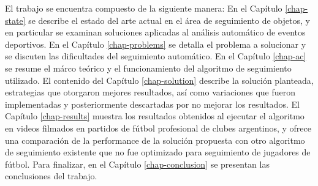 \documentclass[a4paper,11pt]{report}
\begin{document}
El trabajo se encuentra compuesto de la siguiente manera: En el Capítulo
\ref{chap-state} se describe el estado del arte actual en el área de
seguimiento de objetos, y en particular se examinan soluciones aplicadas al
análisis automático de eventos deportivos. En el Capítulo
\ref{chap-problems} se detalla el problema a solucionar y se discuten las
dificultades del seguimiento automático. En el Capítulo \ref{chap-ac} se
resume el márco teórico y el funcionamiento del algoritmo de seguimiento
utilizado. El contenido del Capítulo
\ref{chap-solution} describe la solución planteada, estrategias que otorgaron
mejores resultados, así como variaciones que fueron implementadas y
posteriormente descartadas por no mejorar los resultados. El Capítulo
\ref{chap-results} muestra los resultados obtenidos al ejecutar el algoritmo en
videos filmados en partidos de fútbol profesional de clubes argentinos, y
ofrece una comparación de la performance de la solución propuesta con otro
algoritmo de seguimiento existente que no fue optimizado
para seguimiento de jugadores de fútbol. Para finalizar, en el Capítulo
\ref{chap-conclusion} se presentan las conclusiones del trabajo.

\newpage



\newpage



\newpage



\newpage



\newpage



\newpage



\printbibliography
\end{document}

